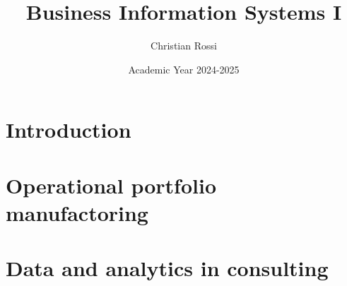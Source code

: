 \documentclass[12pt, a4paper]{report}
\title{\textbf{Business Information Systems I}}
\author{Christian Rossi}
\date{Academic Year 2024-2025}
\begin{document}
    \maketitle

    

    \cleardoublepage{}

    \tableofcontents

    \cleardoublepage{}

    \chapter{Introduction}
    
    
    
    

    \chapter{Operational portfolio manufactoring}
    
    



    \chapter{Data and analytics in consulting}
    
    
\end{document}
